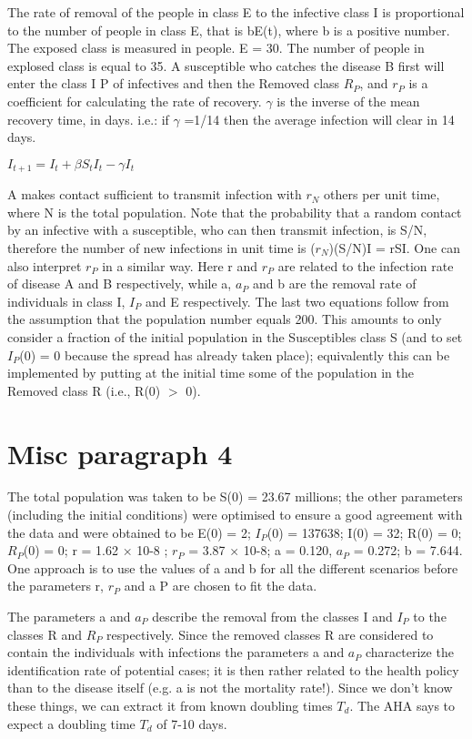 \documentclass{bmcart}
\begin{document}
The rate of removal of the people in class E to the infective class I is proportional to the number of people in class E, that is bE(t), where b is a positive number. The exposed class is measured in people. E = 30. The number of people in explosed class is equal to 35. A susceptible who catches
the disease B first will enter the class I P of infectives and
then the Removed class $R_{P}$, and $r_{P}$ is a coefficient for calculating the rate of recovery. $\gamma$ is the inverse of the mean recovery time, in days. i.e.: if $\gamma$ =1/14 then the average infection will clear in 14 days.

\begin{math}
I_{t+1} = I_t + \beta S_t I_t - \gamma I_t
\end{math}

A makes contact sufficient to transmit infection with $r_{N}$ others per unit time, where N is the total population. Note that the probability that a random contact by an infective with a susceptible, who can then transmit infection, is S/N, therefore the number of new infections in unit time is ($r_{N}$)(S/N)I = rSI. One can also interpret $r_{P}$ in a similar way. Here r and $r_{P}$ are related to the infection rate of disease A and B respectively, while a, $a_{P}$ and b are the removal rate of individuals in class I, $I_{P}$ and E respectively. The last two equations  follow  from  the  assumption  that  the  population number equals 200. This amounts to only consider a fraction of the initial population in the Susceptibles class S (and to set $I_{P}$(0) = 0 because the spread has already  taken  place);  equivalently  this  can  be  implemented by putting at the initial time some of the population in the Removed class R (i.e., R(0) $>$ 0).


\section{Misc paragraph 4}

The total
population was taken to be S(0) = 23.67 millions; the other parameters (including the initial conditions) were optimised to ensure a good agreement with the data and were obtained to be E(0) = 2; $I_{P}$(0) = 137638; I(0) = 32;
R(0) = 0; $R_{P}$(0) = 0; r = 1.62 × 10-8 ; $r_{P}$ = 3.87 × 10-8; a = 0.120, $a_{P}$ = 0.272; b = 7.644. One approach is to use the values of a and b for all the different scenarios before the
parameters r, $r_{P}$ and a P are chosen to fit the data.


The parameters a and $a_{P}$ describe the removal from the classes I and $I_{P}$ to the classes R and $R_{P}$ respectively. Since the removed classes R are considered to contain the individuals with infections the parameters a and $a_{P}$ characterize the identification rate of potential cases; it is then rather related to the health policy than to the disease itself (e.g. a is not the mortality rate!). Since we don't know these
things, we can extract it from known doubling times $T_{d}$. The AHA says to expect a doubling time
$T_{d}$ of 7-10 days.
\end{document}
